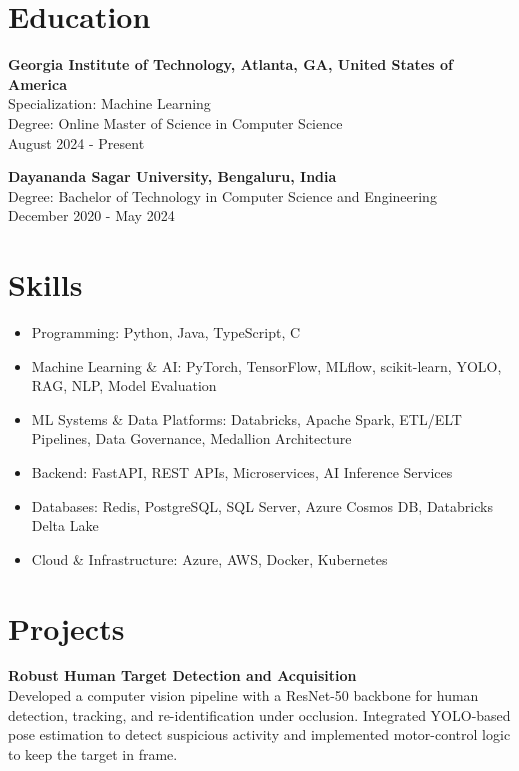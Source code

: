 \documentclass[a4paper,10pt]{article}
\begin{document}
\section*{Education}
\vspace{1mm}
\textbf{Georgia Institute of Technology, Atlanta, GA, United States of America} \\
Specialization: Machine Learning \\
Degree: Online Master of Science in Computer Science \\
August 2024 - Present

\vspace{1mm}
\textbf{Dayananda Sagar University, Bengaluru, India} \\
Degree: Bachelor of Technology in Computer Science and Engineering \\
December 2020 - May 2024
\vspace{1mm}

\section*{Skills}
\vspace{1mm}
\begin{itemize}
    \item Programming: Python, Java, TypeScript, C
    \item Machine Learning \& AI: PyTorch, TensorFlow, MLflow, scikit-learn, YOLO, RAG, NLP, Model Evaluation
    \item ML Systems \& Data Platforms: Databricks, Apache Spark, ETL/ELT Pipelines, Data Governance, Medallion Architecture
    \item Backend: FastAPI, REST APIs, Microservices, AI Inference Services
    \item Databases: Redis, PostgreSQL, SQL Server, Azure Cosmos DB, Databricks Delta Lake
    \item Cloud \& Infrastructure: Azure, AWS, Docker, Kubernetes
\end{itemize}
\vspace{1mm}

\section*{Projects}
\vspace{1mm}
\textbf{Robust Human Target Detection and Acquisition} \\
Developed a computer vision pipeline with a ResNet-50 backbone for human detection, tracking, and re-identification under occlusion. Integrated YOLO-based pose estimation to detect suspicious activity and implemented motor-control logic to keep the target in frame.
\end{document}
